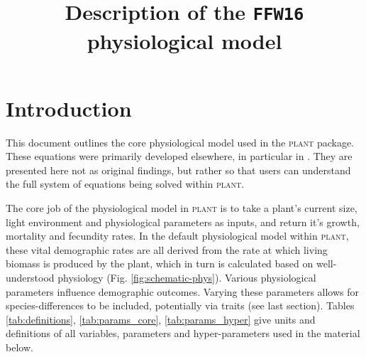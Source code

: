 \documentclass[10pt,twoside]{article}
\title{Description of the \texttt{FFW16} physiological model}
\date{}
\newcommand{\plant}{\textsc{plant}}
\begin{document}
\maketitle

\tableofcontents

\section{Introduction}

This document outlines the core physiological model used in the {\plant}
package. These equations were primarily developed elsewhere, in particular in
\citet{Falster-2011}. They are presented here not as original findings,
but rather so that users can understand the full system of equations being
solved within {\plant}.

The core job of the physiological model in {\plant} is to take a plant's
current size, light environment and physiological parameters as inputs,
and return it's growth, mortality and fecundity rates. In the default
physiological model within {\plant}, these vital demographic rates are all
derived from the rate at which living biomass is produced by the plant,
which in turn is calculated based on well-understood physiology (Fig.
\ref{fig:schematic-phys}). Various physiological parameters
influence demographic outcomes. Varying these parameters allows for
species-differences to be included, potentially via traits (see last
section). Tables
\ref{tab:definitions}, \ref{tab:params_core},  \ref{tab:params_hyper} give
 units and definitions of all variables, parameters and hyper-parameters used in
 the material below.
\end{document}
